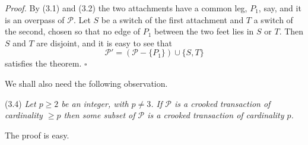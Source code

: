 \textit{Proof.} By (3.1) and (3.2) the two attachments have a common leg, $P_1$, say, and it is an overpass of $\mathscr{P}$. Let $S$ be a switch of the first attachment and $T$ a switch of the second, chosen so that no edge of $P_1$ between the two feet lies in $S$ or $T$. Then $S$ and $T$ are disjoint, and it is easy to see that
\begin{equation*}
\mathscr{P}' = (\mathscr{P} - \{P_1\}) \cup \{S, T\}
\end{equation*}
satisfies the theorem. $\square$

We shall also need the following observation.

\stmt
(3.4) \textit{Let $p \ge 2$ be an integer, with $p \ne 3$. If $\mathscr{P}$ is a crooked transaction of cardinality $\ge p$ then some subset of $\mathscr{P}$ is a crooked transaction of cardinality $p$.}

The proof is easy.

